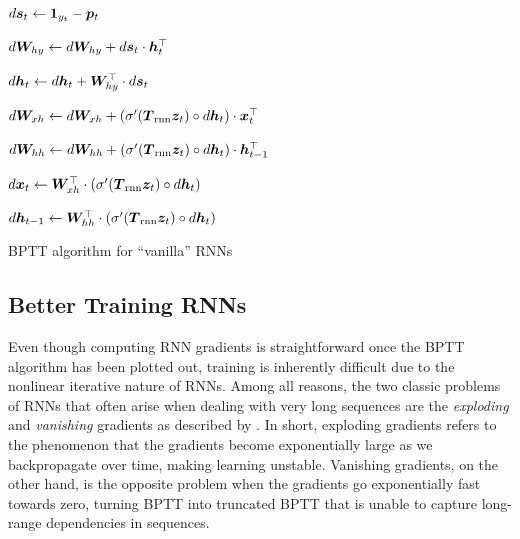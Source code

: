 \begin{algorithm}
{
$d\bm{s}_{t} \leftarrow \bm{1}_{y_t} - \bm{p}_{t}$

$d\bm{W}_{hy} \leftarrow d\bm{W}_{hy} + d\bm{s}_{t} \cdot \bm{h}_{t}^\top$

$d\bm{h}_{t} \leftarrow d\bm{h}_{t} + \bm{W}_{hy}^\top \cdot d\bm{s}_{t}$

$d\bm{W}_{xh} \leftarrow d\bm{W}_{xh} + \left(\sigma'(\mbox{\boldmath{$T$}}_{\text{rnn}} \bm{z}_{t}) \circ d\bm{h}_{t}\right) \cdot \bm{x}_{t}^\top$

$d\bm{W}_{hh} \leftarrow d\bm{W}_{hh} + \left(\sigma'(\mbox{\boldmath{$T$}}_{\text{rnn}} \bm{z}_{t}) \circ d\bm{h}_{t}\right) \cdot \bm{h}_{t-1}^\top$

$d\bm{x}_{t} \leftarrow \bm{W}_{xh}^\top \cdot \left(\sigma'(\mbox{\boldmath{$T$}}_{\text{rnn}} \bm{z}_{t}) \circ d\bm{h}_{t}\right)$

$d\bm{h}_{t-1} \leftarrow \bm{W}_{hh}^\top \cdot \left(\sigma'(\mbox{\boldmath{$T$}}_{\text{rnn}} \bm{z}_{t}) \circ d\bm{h}_{t}\right)$
}
\caption{BPTT algorithm for ``vanilla'' RNNs}
\end{algorithm}

\subsection{Better Training RNNs}
Even though computing RNN gradients is straightforward once 
the BPTT algorithm has been plotted out, training is inherently difficult due to the nonlinear
iterative nature of RNNs. Among all reasons, 
the two classic problems of RNNs that often arise when dealing with very long sequences are the {\it
exploding} and {\it vanishing} gradients as
described by . In short, exploding gradients refers to the
phenomenon that the gradients become exponentially large as we backpropagate
over time, making learning unstable. Vanishing gradients, on the
other hand, is the opposite problem when the gradients go exponentially fast
towards zero, turning BPTT into truncated BPTT that is unable to capture long-range
dependencies in sequences. 

